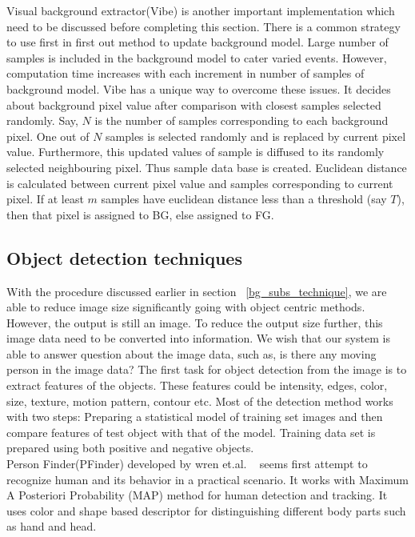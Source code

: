 \indent Visual background extractor(Vibe) \cite{9} is another important
implementation which need to be discussed before completing this
section. There is a common strategy to use first in first out method to
update background model. Large number of samples is included in the
background model to cater varied events. However, computation time
increases with each increment in number of samples of background model.
Vibe has a unique way to overcome these issues. It decides about
background pixel value after comparison with closest samples selected
randomly. Say, $N$ is the number of samples corresponding to each
background pixel. One out of $N$ samples is selected
randomly and is replaced by current pixel value. Furthermore, this
updated values of sample is diffused to its randomly selected
neighbouring pixel. Thus sample data base is created. Euclidean distance
is calculated between current pixel value and samples corresponding to
current pixel. If at least $m$ samples have euclidean distance less than
a threshold (say $T$), then that pixel is assigned to BG, else assigned to
FG.\\
\subsection{Object detection techniques}
\indent With the procedure discussed earlier in section
~\ref{bg_subs_technique}, we are able to reduce image size significantly
going with object centric methods. However, the output is still an
image. To reduce the output size further, this image data need to be
converted into information. We wish that our system is able to answer
question about the image data, such as, is there any moving person in
the image data? The first task for object detection from the image is to
extract features of the objects. These features could be intensity, edges,
color, size, texture, motion pattern, contour etc.  Most of the
detection method works with two steps: Preparing a statistical model of
training set images and then compare features of test object with that
of the model.  Training data set is prepared using both positive and
negative objects.\\

\indent Person Finder(PFinder) developed by wren et.al. ~\cite{12} seems
first attempt to recognize human and its behavior in a practical
scenario. It works with Maximum A Posteriori Probability (MAP) method
for human detection and tracking. It uses color and shape based
descriptor for distinguishing different body parts such as hand and
head.\\


